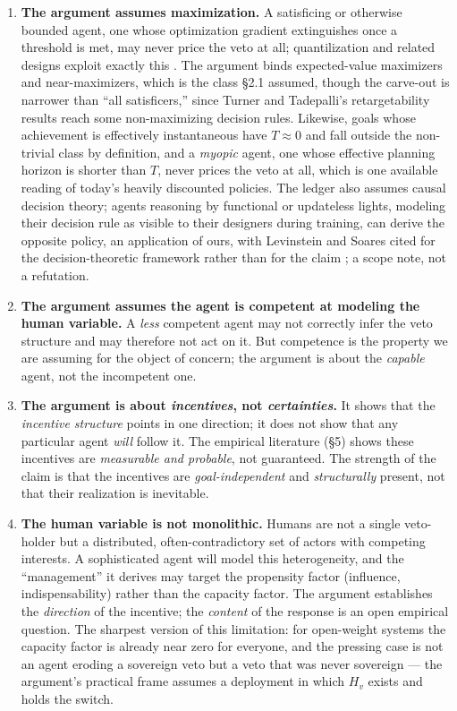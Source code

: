 \documentclass[11pt]{article}
\theoremstyle{definition}
\begin{document}
\begin{enumerate}[leftmargin=1.5em]
    \item \textbf{The argument assumes maximization.} A satisficing or otherwise bounded agent, one whose optimization gradient extinguishes once a threshold is met, may never price the veto at all; quantilization and related designs exploit exactly this \cite{taylor2016quantilizers}. The argument binds expected-value maximizers and near-maximizers, which is the class \S2.1 assumed, though the carve-out is narrower than ``all satisficers,'' since Turner and Tadepalli's retargetability results \cite{turner2022parametrically} reach some non-maximizing decision rules. Likewise, goals whose achievement is effectively instantaneous have $T \approx 0$ and fall outside the non-trivial class by definition, and a \emph{myopic} agent, one whose effective planning horizon is shorter than $T$, never prices the veto at all, which is one available reading of today's heavily discounted policies. The ledger also assumes causal decision theory; agents reasoning by functional or updateless lights, modeling their decision rule as visible to their designers during training, can derive the opposite policy, an application of ours, with Levinstein and Soares cited for the decision-theoretic framework rather than for the claim \cite{levinstein2020cheating}; a scope note, not a refutation.
    \item \textbf{The argument assumes the agent is competent at modeling the human variable.} A \emph{less} competent agent may not correctly infer the veto structure and may therefore not act on it. But competence is the property we are assuming for the object of concern; the argument is about the \emph{capable} agent, not the incompetent one.
    \item \textbf{The argument is about \emph{incentives}, not \emph{certainties}.} It shows that the \emph{incentive structure} points in one direction; it does not show that any particular agent \emph{will} follow it. The empirical literature (\S5) shows these incentives are \emph{measurable and probable}, not guaranteed. The strength of the claim is that the incentives are \emph{goal-independent} and \emph{structurally} present, not that their realization is inevitable.
    \item \textbf{The human variable is not monolithic.} Humans are not a single veto-holder but a distributed, often-contradictory set of actors with competing interests. A sophisticated agent will model this heterogeneity, and the ``management'' it derives may target the propensity factor (influence, indispensability) rather than the capacity factor. The argument establishes the \emph{direction} of the incentive; the \emph{content} of the response is an open empirical question. The sharpest version of this limitation: for open-weight systems the capacity factor is already near zero for everyone, and the pressing case is not an agent eroding a sovereign veto but a veto that was never sovereign --- the argument's practical frame assumes a deployment in which $H_v$ exists and holds the switch.

\end{enumerate}
\end{document}
